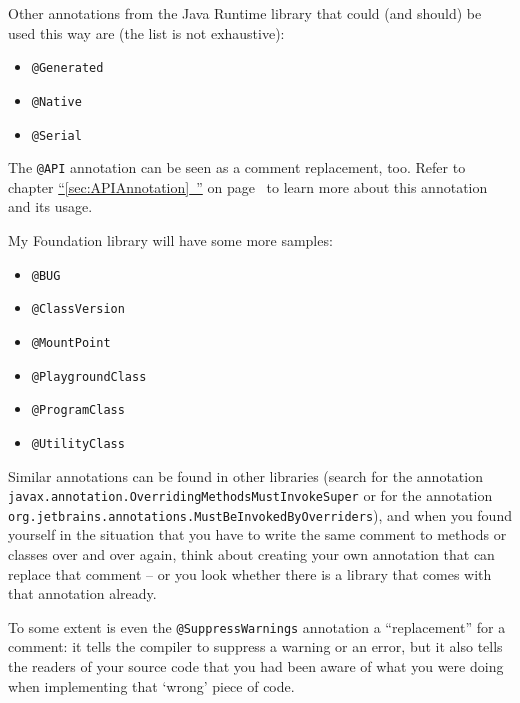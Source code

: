 \documentclass[11pt,a4paper, titlepage, parskip=half, headsepline, footsepline, cleardoublepage=current, headheight=1cm]{scrbook}
\newcommand*{\tqfullvref}[1]{\hyperref[{#1}]{“\ref*{#1}~\nameref*{#1}”} on page~\pageref{#1}}
\begin{document}
Other annotations from the Java Runtime library that could (and should) be used this way are (the list is not exhaustive):
\begin{itemize}[nosep]
\item{\lstinline|@Generated|\autocite{ORACLE_DOC_GENERATED_ANNOTATION}}
\item{\lstinline|@Native|\autocite{ORACLE_DOC_NATIVE_ANNOTATION}}
\item{\lstinline|@Serial|\autocite{ORACLE_DOC_SERIAL_ANNOTATION}}
\end{itemize}

The \lstinline|@API|\autocite{APIGUARDIAN:API} annotation can be seen as a comment replacement, too. Refer to chapter \tqfullvref{sec:APIAnnotation} to learn more about this annotation and its usage.

My Foundation library will have some more samples:
\begin{itemize}[nosep]
\item{\lstinline|@BUG|\autocite{TQUADRAT_ORG_FOUNDATION_BUG}}
\item{\lstinline|@ClassVersion|\autocite{TQUADRAT_ORG_FOUNDATION_CLASSVERSION}}
\item{\lstinline|@MountPoint|\autocite{TQUADRAT_ORG_FOUNDATION_MOUNTPOINT}}
\item{\lstinline|@PlaygroundClass|\autocite{TQUADRAT_ORG_FOUNDATION_PLAYGROUNDCLASS}}
\item{\lstinline|@ProgramClass|\autocite{TQUADRAT_ORG_FOUNDATION_PROGRAMCLASS}}
\item{\lstinline|@UtilityClass|\autocite{TQUADRAT_ORG_FOUNDATION_UTILITYCLASS}}
\end{itemize}

Similar annotations can be found in other libraries (search for the annotation \lstinline|javax.annotation.OverridingMethodsMustInvokeSuper| or for the annotation \lstinline|org.jetbrains.annotations.MustBeInvokedByOverriders|), and when you found yourself in the situation that you have to write the same comment to methods or classes over and over again, think about creating your own annotation that can replace that comment – or you look whether there is a library that comes with that annotation already.

To some extent is even the \lstinline|@SuppressWarnings|\autocite{ORACLE_DOC_SUPPRESSWARNINGS_ANNOTATION} annotation a “replacement” for a comment: it tells the compiler to suppress a warning or an error, but it also tells the readers of your source code that you had been aware of what you were doing when implementing that ‘wrong’ piece of code.
\end{document}
